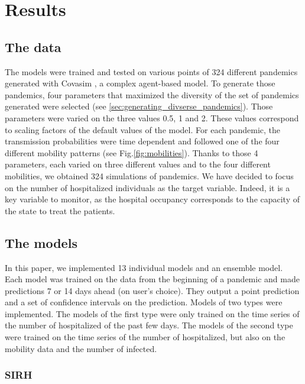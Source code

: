 \section*{Results}


\subsection{The data}

The models were trained and tested on various points of 324 different pandemics generated with Covasim \cite*{kerr2021covasim}, a complex agent-based model. 
To generate those pandemics, four parameters that maximized the diversity of the set of pandemics generated were selected (see \ref{sec:generating_divserse_pandemics}). 
Those parameters were varied on the three values 0.5, 1 and 2. 
These values correspond to scaling factors of the default values of the model. 
For each pandemic, the transmission probabilities were time dependent and followed one of the four different mobility patterns (see Fig.\ref{fig:mobilities}). 
Thanks to those 4 parameters, each varied on three different values and to the four different mobilities, we obtained 324 simulations of pandemics. 
We have decided to focus on the number of hospitalized individuals as the target variable. 
Indeed, it is a key variable to monitor, as the hospital occupancy corresponds to the capacity of the state to treat the patients. 


\subsection*{The models}

In this paper, we implemented 13 individual models and an ensemble model.
Each model was trained on the data from the beginning of a pandemic and made predictions 7 or 14 days ahead (on user's choice).
They output a point prediction and a set of confidence intervals on the prediction. 
Models of two types were implemented. 
The models of the first type were only trained on the time series of the number of hospitalized of the past few days. 
The models of the second type were trained on the time series of the number of hospitalized, but also on the mobility data and the number of infected. 

\subsubsection{SIRH}

